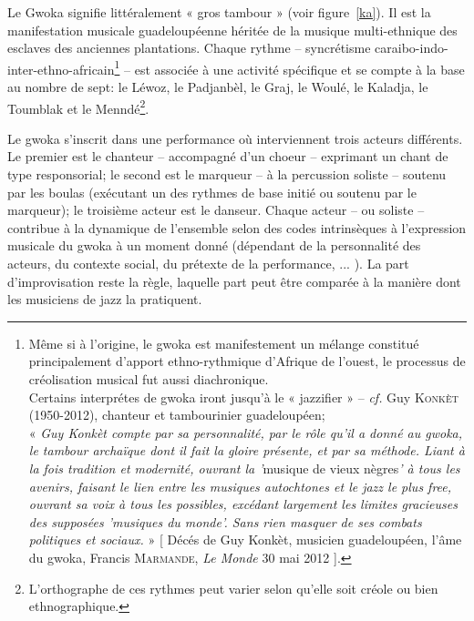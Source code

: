 \documentclass[12pt, fleqn]{extarticle}
\begin{document}



\clearpage

\clearpage
{}
\bigskip
\par
Le Gwoka signifie littéralement « gros tambour » (voir figure~\ref{ka}). Il est la manifestation musicale guadeloupéenne héritée de la musique multi-ethnique des esclaves des anciennes plantations. Chaque rythme -- syncrétisme caraibo-indo-inter-ethno-africain\footnote{Même si à l'origine, le gwoka est manifestement un mélange constitué principalement d'apport ethno-rythmique d'Afrique de l'ouest, le processus de créolisation musical fut aussi diachronique.\\ \indent Certains interprétes de gwoka iront jusqu'à le « jazzifier » -- \textit{cf.} Guy \textsc{Konkèt} (1950-2012), chanteur et tambourinier guadeloupéen;\\ « \textit{Guy Konkèt compte par sa personnalité, par le rôle qu'il a donné au gwoka, le tambour archaïque dont il fait la gloire présente, et par sa méthode. Liant à la fois tradition et modernité, ouvrant la '}musique de vieux nègres\textit{' à tous les avenirs, faisant le lien entre les musiques autochtones et le jazz le plus free, ouvrant sa voix à tous les possibles, excédant largement les limites gracieuses des supposées 'musiques du monde'. Sans rien masquer de ses combats politiques et sociaux.} » [ Décés de Guy Konkèt, musicien guadeloupéen, l'âme du gwoka, Francis \textsc{Marmande}, \textit{Le Monde} 30 mai 2012 ].\label{ftn:konk}} -- est associée à une activité spécifique et se compte à la base au nombre de sept: le Léwoz, le Padjanbèl, le Graj, le Woulé, le Kaladja, le Toumblak et le Menndé\footnote{L'orthographe de ces rythmes peut varier selon qu'elle soit créole ou bien ethnographique.}. 

\bigskip

\bigskip

\par
Le gwoka s'inscrit dans une performance où interviennent trois acteurs différents. Le premier est le chanteur -- accompagné d'un choeur -- exprimant un chant de type responsorial; le second est le marqueur -- à la percussion soliste -- soutenu par les boulas (exécutant un des rythmes de base initié ou soutenu par le marqueur); le troisième acteur est le danseur. Chaque acteur -- ou soliste -- contribue à la dynamique de l'ensemble selon des codes intrinsèques à l'expression musicale du gwoka à un moment donné (dépendant de la personnalité des acteurs, du contexte social, du prétexte de la performance, ... ). La part d'improvisation reste la règle, laquelle part peut être comparée à la manière dont les musiciens de jazz la pratiquent. 
\end{document}
